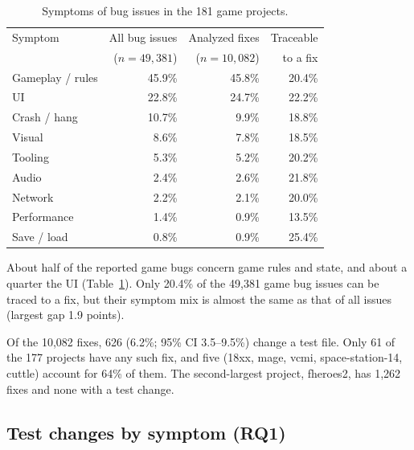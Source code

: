 \documentclass[10pt,twocolumn,a4paper]{article}
\begin{document}
\begin{table}[htbp]
\centering
\caption{Symptoms of bug issues in the 181 game projects.}\label{tab:dist}
\footnotesize
\begin{tabular}{@{}lrrr@{}}
\toprule
Symptom & All bug issues & Analyzed fixes & Traceable\\
 & ($n=49{,}381$) & ($n=10{,}082$) & to a fix\\
\midrule
Gameplay / rules & 45.9\% & 45.8\% & 20.4\%\\
UI & 22.8\% & 24.7\% & 22.2\%\\
Crash / hang & 10.7\% & 9.9\% & 18.8\%\\
Visual & 8.6\% & 7.8\% & 18.5\%\\
Tooling & 5.3\% & 5.2\% & 20.2\%\\
Audio & 2.4\% & 2.6\% & 21.8\%\\
Network & 2.2\% & 2.1\% & 20.0\%\\
Performance & 1.4\% & 0.9\% & 13.5\%\\
Save / load & 0.8\% & 0.9\% & 25.4\%\\
\bottomrule
\end{tabular}
\end{table}

About half of the reported game bugs concern game rules and state, and about a quarter the UI (Table~\ref{tab:dist}).
Only 20.4\% of the 49,381 game bug issues can be traced to a fix, but their symptom mix is almost the same as that of all issues (largest gap 1.9 points).

Of the 10,082 fixes, 626 (6.2\%; 95\% CI 3.5--9.5\%) change a test file.
Only 61 of the 177 projects have any such fix, and five (18xx, mage, vcmi, space-station-14, cuttle) account for 64\% of them.
The second-largest project, fheroes2, has 1,262 fixes and none with a test change.

\subsection{Test changes by symptom (RQ1)}\label{sec:rq1}
\end{document}
